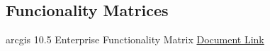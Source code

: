 %
%
%
\subsection{Funcionality Matrices}
arcgis 10.5 Enterprise Functionality Matrix
\href{../../documentation/references/ESRI/arcgis10.5EnterpriseFunctionalityMatrix.pdf}{Document Link}

